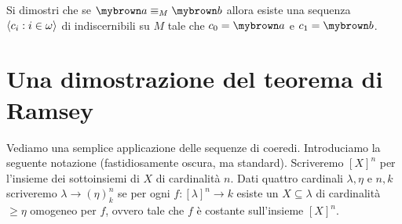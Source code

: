 \begin{exercise}
Si dimostri che se ${\mr a}\equiv_M{\mr b}$ allora esiste una sequenza $\langle c_i:i\in\omega\rangle$ di indiscernibili su $M$ tale che $c_0={\mr a}$ e $c_1={\mr b}$.
\end{exercise}


\section{Una dimostrazione del teorema di Ramsey}

Vediamo una semplice applicazione delle sequenze di coeredi.
Introduciamo la seguente notazione (fastidiosamente oscura, ma standard). Scriveremo $[X]^n$ per l'insieme dei sottoinsiemi di $X$ di cardinalit\`a $n$. Dati quattro cardinali $\lambda,\eta$ e $n,k$ scriveremo $\lambda\to(\eta)^n_k$ se per ogni $f:[\lambda]^n\to k$ esiste un $X\subseteq\lambda$ di cardinalit\`a $\ge\eta$ omogeneo per $f$, ovvero tale che $f$ \`e costante sull'insieme $[X]^n$.

